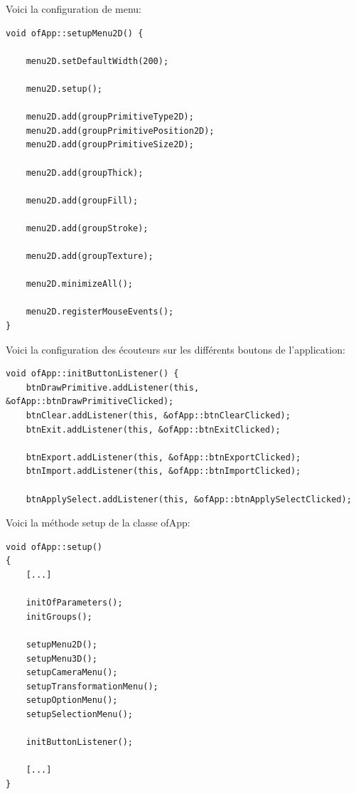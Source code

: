 Voici la configuration de menu:
\begin{lstlisting}
void ofApp::setupMenu2D() {

	menu2D.setDefaultWidth(200);
	
	menu2D.setup();
	
	menu2D.add(groupPrimitiveType2D);
	menu2D.add(groupPrimitivePosition2D);
	menu2D.add(groupPrimitiveSize2D);
	
	menu2D.add(groupThick);
	
	menu2D.add(groupFill);
	
	menu2D.add(groupStroke);
	
	menu2D.add(groupTexture);
	
	menu2D.minimizeAll();
	
	menu2D.registerMouseEvents();
}
\end{lstlisting}

Voici la configuration des écouteurs sur les différents boutons de l'application:
\begin{lstlisting}
void ofApp::initButtonListener() {
	btnDrawPrimitive.addListener(this, &ofApp::btnDrawPrimitiveClicked);
	btnClear.addListener(this, &ofApp::btnClearClicked);
	btnExit.addListener(this, &ofApp::btnExitClicked);
	
	btnExport.addListener(this, &ofApp::btnExportClicked);
	btnImport.addListener(this, &ofApp::btnImportClicked);
	
	btnApplySelect.addListener(this, &ofApp::btnApplySelectClicked);

\end{lstlisting}

Voici la méthode setup de la classe ofApp:
\begin{lstlisting}
void ofApp::setup()
{
	[...]
	
	initOfParameters();
	initGroups();
	
	setupMenu2D();
	setupMenu3D();
	setupCameraMenu();
	setupTransformationMenu();
	setupOptionMenu();
	setupSelectionMenu();
	
	initButtonListener();
	
	[...]
}
\end{lstlisting}

